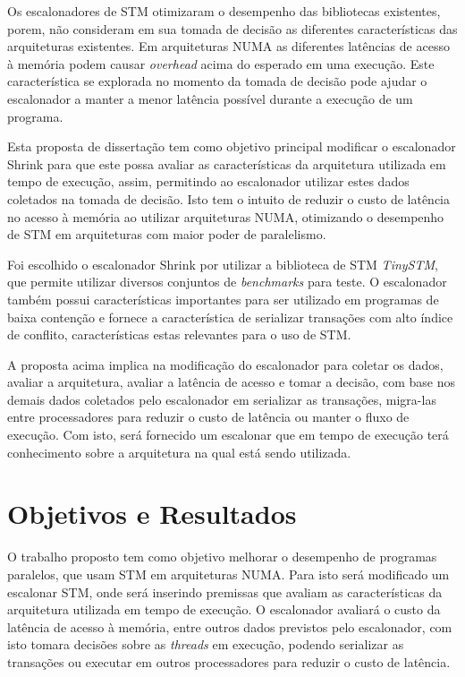 \documentclass[diss-proposta,nocipinfo]{texufpel}
\begin{document}
Os escalonadores de STM otimizaram o desempenho das bibliotecas existentes, porem, não consideram em sua tomada de decisão as diferentes características das arquiteturas existentes. Em arquiteturas NUMA as diferentes latências de acesso à memória podem causar \emph{overhead} acima do esperado em uma execução. Este característica se explorada no momento da tomada de decisão pode ajudar o escalonador a manter a menor latência possível durante a execução de um programa.

Esta proposta de dissertação tem como objetivo principal modificar o escalonador Shrink para que este possa avaliar as características da arquitetura utilizada em tempo de execução, assim, permitindo ao escalonador utilizar estes dados coletados na tomada de decisão. Isto tem o intuito de reduzir o custo de latência no acesso à memória ao utilizar arquiteturas NUMA, otimizando o desempenho de STM em arquiteturas com maior poder de paralelismo.

Foi escolhido o escalonador Shrink por utilizar a biblioteca de STM \emph{TinySTM}, que permite utilizar diversos conjuntos de \emph{benchmarks} para teste. O escalonador também possui características importantes para ser utilizado em programas de baixa contenção e fornece a característica de serializar transações com alto índice de conflito, características estas relevantes para o uso de STM.

A proposta acima implica na modificação do escalonador para coletar os dados, avaliar a arquitetura, avaliar a latência de acesso e tomar a decisão, com base nos demais dados coletados pelo escalonador em serializar as transações, migra-las entre processadores para reduzir o custo de latência ou manter o fluxo de execução. Com isto, será fornecido um escalonar que em tempo de execução terá conhecimento sobre a arquitetura na qual está sendo utilizada.

\chapter{Objetivos e Resultados}

O trabalho proposto tem como objetivo melhorar o desempenho de programas paralelos, que usam STM em arquiteturas NUMA. Para isto será modificado um escalonar STM, onde será inserindo premissas que avaliam as características da arquitetura utilizada em tempo de execução. O escalonador avaliará o custo da latência de acesso à memória, entre outros dados previstos pelo escalonador, com isto tomara decisões sobre as \emph{threads} em execução, podendo serializar as transações ou executar em outros processadores para reduzir o custo de latência.
\end{document}
